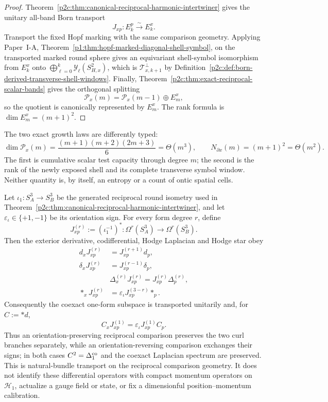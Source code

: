 \documentclass[12pt,a4paper]{article}
\begin{document}
\begin{proof}
Theorem~\ref{p2c:thm:canonical-reciprocal-harmonic-intertwiner} gives the
unitary all-band Born transport
\[
 J_{xp}:E_k^p\xrightarrow{\sim}E_k^x.
\]
Transport the fixed Hopf marking with the same comparison geometry.  Applying
Paper~I-A, Theorem~\ref{p1:thm:hopf-marked-diagonal-shell-symbol}, on the
transported marked round sphere gives an equivariant shell-symbol
isomorphism from \(E_k^x\) onto
\(\bigoplus_{\ell=0}^{k}\mathscr Y_\ell(S^2_{H,x})\), which is
\(\mathcal T_{x,k+1}^{\perp}\) by
Definition~\ref{p2c:def:born-derived-transverse-shell-windows}.  Finally,
Theorem~\ref{p2c:thm:exact-reciprocal-scalar-bands} gives the orthogonal
splitting
\[
 \mathcal P_x(m)=\mathcal P_x(m-1)\oplus E_m^x,
\]
so the quotient is canonically represented by \(E_m^x\).  The rank formula
is \(\dim E_m^x=(m+1)^2\).
\end{proof}

\begin{remark}
\label{p2c:rem:bulk-versus-frontier-rank}
The two exact growth laws are differently typed:
\[
 \dim\mathcal P_x(m)
 =\frac{(m+1)(m+2)(2m+3)}6=\Theta(m^3),
 \qquad
 N_{\partial x}(m)=(m+1)^2=\Theta(m^2).
\]
The first is cumulative scalar test capacity through degree \(m\); the second
is the rank of the newly exposed shell and its complete transverse symbol
window.  Neither quantity is, by itself, an entropy or a count of ontic
spatial cells.
\end{remark}

\begin{theorem}
\label{p2c:thm:v244-reciprocal-natural-bundle-transport}
Let \(\iota_1:S_A^3\to S_B^3\) be the generated reciprocal round isometry
used in Theorem~\ref{p2c:thm:canonical-reciprocal-harmonic-intertwiner}, and
let \(\varepsilon_{\iota}\in\{+1,-1\}\) be its orientation sign.  For every
form degree \(r\), define
\[
 J_{xp}^{(r)}:=(\iota_1^{-1})^*:
 \Omega^r(S_A^3)\longrightarrow\Omega^r(S_B^3).
\]
Then the exterior derivative, codifferential, Hodge Laplacian and Hodge star
obey
\begin{align}
 d_xJ_{xp}^{(r)}&=J_{xp}^{(r+1)}d_p,\\
 \delta_xJ_{xp}^{(r)}&=J_{xp}^{(r-1)}\delta_p,\\
 &\boxed{\Delta_x^{(r)}J_{xp}^{(r)}=J_{xp}^{(r)}\Delta_p^{(r)}},\\
 *_xJ_{xp}^{(r)}&=\varepsilon_{\iota}
 J_{xp}^{(3-r)}*_p .
\end{align}
Consequently the coexact one-form subspace is transported unitarily and, for
\(C:=*d\),
\[
 \boxed{C_xJ_{xp}^{(1)}
 =\varepsilon_{\iota}J_{xp}^{(1)}C_p}.
\]
Thus an orientation-preserving reciprocal comparison preserves the two curl
branches separately, while an orientation-reversing comparison exchanges
their signs; in both cases \(C^2=\Delta_1^{\rm co}\) and the coexact
Laplacian spectrum are preserved.  This is natural-bundle transport on the
reciprocal comparison geometry.  It does not identify these differential
operators with compact momentum operators on \(\mathcal H_1\), actualize a
gauge field or state, or fix a dimensionful position--momentum calibration.
\end{theorem}
\end{document}
